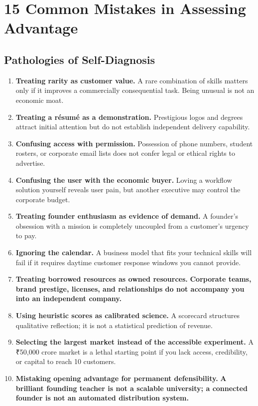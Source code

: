 \section{15 Common Mistakes in Assessing Advantage}

\subsection{Pathologies of Self-Diagnosis}

\begin{enumerate}[label=\textbf{\arabic*.},leftmargin=11pt,itemsep=2pt,topsep=1.5pt,parsep=0pt]
  \item \textbf{Treating rarity as customer value.} A rare combination of skills matters only if it improves a commercially consequential task. Being unusual is not an economic moat.
  \item \textbf{Treating a résumé as a demonstration.} Prestigious logos and degrees attract initial attention but do not establish independent delivery capability.
  \item \textbf{Confusing access with permission.} Possession of phone numbers, student rosters, or corporate email lists does not confer legal or ethical rights to advertise.
  \item \textbf{Confusing the user with the economic buyer.} Loving a workflow solution yourself reveals user pain, but another executive may control the corporate budget.
  \item \textbf{Treating founder enthusiasm as evidence of demand.} A founder's obsession with a mission is completely uncoupled from a customer's urgency to pay.
  \item \textbf{Ignoring the calendar.} A business model that fits your technical skills will fail if it requires daytime customer response windows you cannot provide.
  \item \textbf{Treating borrowed resources as owned resources.} \textbf{Corporate teams, brand prestige, licenses, and relationships do not accompany you into an independent company.}
  \item \textbf{Using heuristic scores as calibrated science.} A scorecard structures qualitative reflection; it is not a statistical prediction of revenue.
  \item \textbf{Selecting the largest market instead of the accessible experiment.} A ₹50,000 crore market is a lethal starting point if you lack access, credibility, or capital to reach 10 customers.
  \item \textbf{Mistaking opening advantage for permanent defensibility.} \textbf{A brilliant founding teacher is not a scalable university; a connected founder is not an automated distribution system.}

\end{enumerate}
